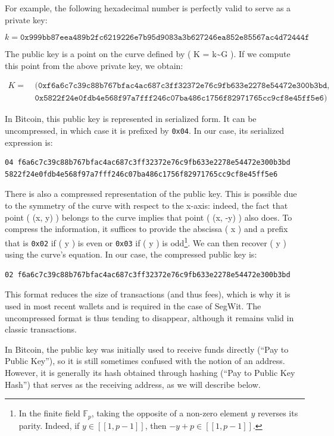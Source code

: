 \documentclass[
  a5paper,
  smalldemyvopaper,10pt,twoside,onecolumn,openright,extrafontsizes,hidelinks]{memoir}
\begin{document}
For example, the following hexadecimal number is perfectly valid to
serve as a private key:

\[k = \mathtt{0x999bb87eea489b2fc6219226e7b95d9083a3b627246ea852e85567ac4d72444f}\]

The public key is a point on the curve defined by ( K =
k\textasciitilde G ). If we compute this point from the above private
key, we obtain:

\[\begin{aligned}
K = &~(\mathtt{0xf6a6c7c39c88b767bfac4ac687c3ff32372e76c9fb633e2278e54472e300b3bd}, \\
    &~\mathtt{0x5822f24e0fdb4e568f97a7fff246c07ba486c1756f82971765cc9cf8e45ff5e6})
\end{aligned}\]

In Bitcoin, this public key is represented in serialized form. It can be
uncompressed, in which case it is prefixed by \texttt{0x04}. In our
case, its serialized expression is:

\begin{verbatim}
04 f6a6c7c39c88b767bfac4ac687c3ff32372e76c9fb633e2278e54472e300b3bd
5822f24e0fdb4e568f97a7fff246c07ba486c1756f82971765cc9cf8e45ff5e6
\end{verbatim}

There is also a compressed representation of the public key. This is
possible due to the symmetry of the curve with respect to the x-axis:
indeed, the fact that point ( (x, y) ) belongs to the curve implies that
point ( (x, -y) ) also does. To compress the information, it suffices to
provide the abscissa ( x ) and a prefix that is \texttt{0x02} if ( y )
is even or \texttt{0x03} if ( y ) is odd\footnote{In the finite field
  \(\mathbb{F}_p\), taking the opposite of a non-zero element \(y\)
  reverses its parity. Indeed, if \(y \in [\![ 1, p - 1 ]\!]\), then
  \(-y + p \in [\![ 1, p - 1 ]\!]\).}. We can then recover ( y ) using
the curve's equation. In our case, the compressed public key is:

\begin{verbatim}
02 f6a6c7c39c88b767bfac4ac687c3ff32372e76c9fb633e2278e54472e300b3bd
\end{verbatim}

This format reduces the size of transactions (and thus fees), which is
why it is used in most recent wallets and is required in the case of
SegWit. The uncompressed format is thus tending to disappear, although
it remains valid in classic transactions.

In Bitcoin, the public key was initially used to receive funds directly
(``Pay to Public Key''), so it is still sometimes confused with the
notion of an address. However, it is generally its hash obtained through
hashing (``Pay to Public Key Hash'') that serves as the receiving
address, as we will describe below.
\end{document}
